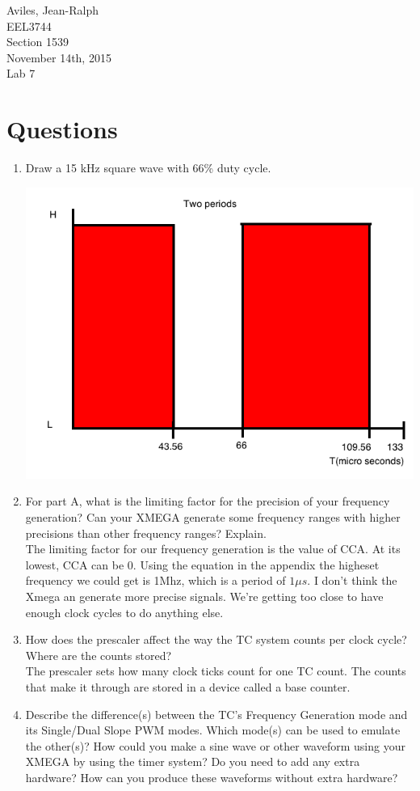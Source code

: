\documentclass[letterpaper, 12pt]{article}
\newcommand{\hwnumber}{Lab 7}
\newcommand{\duedate}{November 14th, 2015}
\newcommand{\capper}{\begin{flushright}Aviles, Jean-Ralph \\ EEL3744 \\ Section 1539 \\ \duedate{} \\ \hwnumber{}\end{flushright}}
\begin{document}
\capper{}
\section*{Questions}
\begin{enumerate}
  \item Draw a 15 kHz square wave with 66\% duty cycle.
    \begin{center}
      \includegraphics[scale=0.6]{square_wave}
    \end{center}
  \item For part A, what is the limiting factor for the precision of your frequency generation? Can your XMEGA generate some frequency ranges with higher precisions than other frequency ranges? Explain. \\
    The limiting factor for our frequency generation is the value of CCA. At its lowest, CCA can be 0. Using the equation in the appendix
    the higheset frequency we could get is 1Mhz, which is a period of $1\mu s$. I don't think the Xmega an generate more precise signals. We're getting
    too close to have enough clock cycles to do anything else.
  \item How does the prescaler affect the way the TC system counts per clock cycle? Where are the counts stored? \\
    The prescaler sets how many clock ticks count for one TC count. The counts that make it through are stored
    in a device called a base counter.
  \item Describe the difference(s) between the TC’s Frequency Generation mode and its Single/Dual Slope PWM modes. Which mode(s) can be used to emulate the other(s)? How could you make a sine wave or other waveform using your XMEGA by using the timer system? Do you need to add any extra hardware? How can you produce these waveforms without extra hardware? \\

\end{enumerate}
\end{document}
